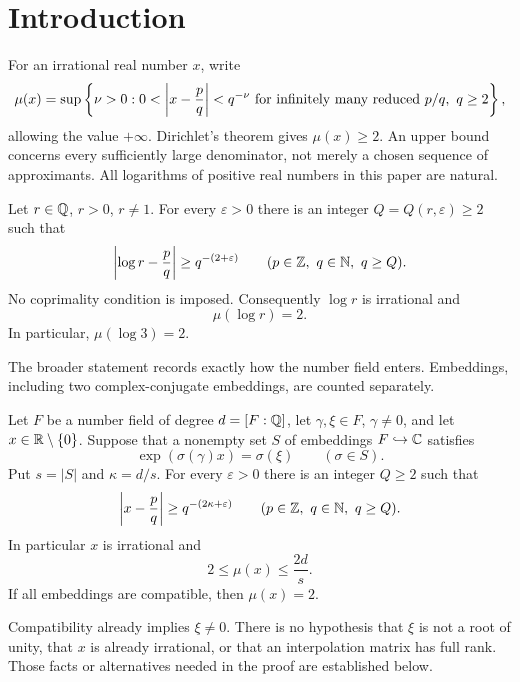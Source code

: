 \section{Introduction}

For an irrational real number \(x\), write
\[
 \mu(x)=\sup\left\{\nu>0:
  0<\left|x-\frac pq\right|<q^{-\nu}
  \text{ for infinitely many reduced }p/q,\ q\ge2\right\},
\]
allowing the value \(+\infty\). Dirichlet's theorem gives
\(\mu(x)\ge2\). An upper bound concerns every sufficiently large
denominator, not merely a chosen sequence of approximants.
All logarithms of positive real numbers in this paper are natural.

\begin{theorem}\label{thm:rational}
Let \(r\in\mathbb Q\), \(r>0\), \(r\ne1\). For every \(\varepsilon>0\)
there is an integer \(Q=Q(r,\varepsilon)\ge2\) such that
\begin{equation}\label{eq:rational-main}
 \left|\log r-\frac pq\right|\ge q^{-(2+\varepsilon)}
 \qquad(p\in\mathbb Z,\ q\in\mathbb N,\ q\ge Q).
\end{equation}
No coprimality condition is imposed. Consequently \(\log r\) is
irrational and
\[
 \mu(\log r)=2.
\]
In particular, \(\mu(\log3)=2\).
\end{theorem}

The broader statement records exactly how the number field enters.
Embeddings, including two complex-conjugate embeddings, are counted
separately.

\begin{theorem}\label{thm:compatible}
Let \(F\) be a number field of degree \(d=[F:\mathbb Q]\), let
\(\gamma,\xi\in F\), \(\gamma\ne0\), and let \(x\in\mathbb R\setminus\{0\}\).
Suppose that a nonempty set \(S\) of embeddings \(F\hookrightarrow\mathbb C\)
satisfies
\begin{equation}\label{eq:compatibility}
 \exp(\sigma(\gamma)x)=\sigma(\xi)\qquad(\sigma\in S).
\end{equation}
Put \(s=|S|\) and \(\kappa=d/s\).
For every \(\varepsilon>0\) there is an integer \(Q\ge2\) such that
\begin{equation}\label{eq:compatible-main}
 \left|x-\frac pq\right|\ge q^{-(2\kappa+\varepsilon)}
 \qquad(p\in\mathbb Z,\ q\in\mathbb N,\ q\ge Q).
\end{equation}
In particular \(x\) is irrational and
\[
 2\le\mu(x)\le\frac{2d}{s}.
\]
If all embeddings are compatible, then \(\mu(x)=2\).
\end{theorem}

Compatibility already implies \(\xi\ne0\). There is no hypothesis that
\(\xi\) is not a root of unity, that \(x\) is already irrational, or
that an interpolation matrix has full rank. Those facts or alternatives
needed in the proof are established below.

